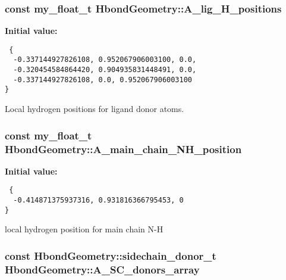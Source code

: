 \subsubsection{\setlength{\rightskip}{0pt plus 5cm}const my\_\-float\_\-t \bf{Hbond\-Geometry::A\_\-lig\_\-H\_\-positions}\hspace{0.3cm}{\tt  [static, private]}}\label{classSimSite3D_1_1HbondGeometry_7749c80383b11d3353e1ffad00700b52}


\textbf{Initial value:}

\begin{Code}\begin{verbatim} {
  -0.337144927826108, 0.952067906003100, 0.0, 
  -0.320454584864420, 0.904935831448491, 0.0, 
  -0.337144927826108, 0.0, 0.952067906003100  
}
\end{verbatim}\end{Code}
Local hydrogen positions for ligand donor atoms. 

\subsubsection{\setlength{\rightskip}{0pt plus 5cm}const my\_\-float\_\-t \bf{Hbond\-Geometry::A\_\-main\_\-chain\_\-NH\_\-position}\hspace{0.3cm}{\tt  [static, private]}}\label{classSimSite3D_1_1HbondGeometry_d2a5bf930c8cc804ff282ab0752d26d4}


\textbf{Initial value:}

\begin{Code}\begin{verbatim} {
  -0.414871375937316, 0.931816366795453, 0
}
\end{verbatim}\end{Code}
local hydrogen position for main chain N-H 

\subsubsection{\setlength{\rightskip}{0pt plus 5cm}const \bf{Hbond\-Geometry::sidechain\_\-donor\_\-t} Hbond\-Geometry::A\_\-SC\_\-donors\_\-array\hspace{0.3cm}{\tt  [static, private]}}\label{classSimSite3D_1_1HbondGeometry_25aa470a8b192c3efde135af8f963f07}


